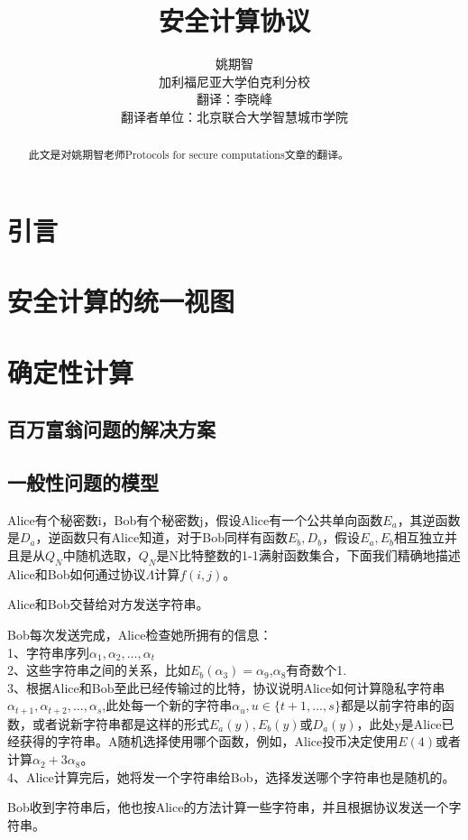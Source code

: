 \documentclass[]{article}
\title{安全计算协议}
\author{姚期智\\
	加利福尼亚大学伯克利分校\\
{\tiny  翻译：李晓峰}\\
{\tiny 翻译者单位：北京联合大学智慧城市学院}
}
\begin{document}
	
	\maketitle
	
	\begin{abstract}
		此文是对姚期智老师Protocols for secure computations文章的翻译。
	\end{abstract}
	
	\section{引言}
	
	\section{安全计算的统一视图}
	
	\section{确定性计算}
	\subsection{百万富翁问题的解决方案}
	\subsection{一般性问题的模型}
	Alice有个秘密数i，Bob有个秘密数j，假设Alice有一个公共单向函数$E_a$，其逆函数是$D_a$，逆函数只有Alice知道，对于Bob同样有函数$E_b,D_b$，假设$E_a,E_b$相互独立并且是从$Q_N$中随机选取，$Q_N$是N比特整数的1-1满射函数集合，下面我们精确地描述Alice和Bob如何通过协议$\Lambda$计算$f(i,j)$。\par
	Alice和Bob交替给对方发送字符串。\par
	Bob每次发送完成，Alice检查她所拥有的信息：\\
	1、字符串序列$\alpha_1,\alpha_2,\ldots,\alpha_t$\\
	2、这些字符串之间的关系，比如$E_b(\alpha_3)=\alpha_9$,$\alpha_8$有奇数个1.\\
	3、根据Alice和Bob至此已经传输过的比特，协议说明Alice如何计算隐私字符串$\alpha_{t+1},\alpha_{t+2},\ldots,\alpha_s$,此处每一个新的字符串$\alpha_u,u\in \{t+1,\ldots,s\}$都是以前字符串的函数，或者说新字符串都是这样的形式$E_a(y),E_b(y)$或$D_a(y)$，此处y是Alice已经获得的字符串。A随机选择使用哪个函数，例如，Alice投币决定使用$E(4)$或者计算$\alpha_2+3\alpha_8$。\\
	4、Alice计算完后，她将发一个字符串给Bob，选择发送哪个字符串也是随机的。\par
	Bob收到字符串后，他也按Alice的方法计算一些字符串，并且根据协议发送一个字符串。\par
	
\end{document}
